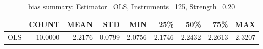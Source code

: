 \begin{table}[ht]
\centering
\caption{bias summary: Estimator=OLS, Instruments=125, Strength=0.20}
\begin{tabular}{lrrrrrrrr}
\toprule
 & COUNT & MEAN & STD & MIN & 25\% & 50\% & 75\% & MAX \\
\midrule
OLS & 10.0000 & 2.2176 & 0.0799 & 2.0756 & 2.1746 & 2.2432 & 2.2613 & 2.3207 \\
\bottomrule
\end{tabular}
\end{table}
